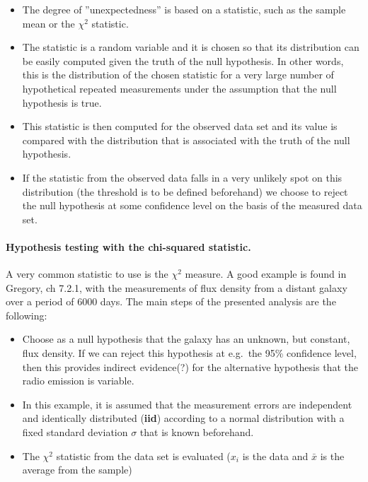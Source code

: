 \documentclass[%
oneside,                 %
final,                   %
10pt]{article}
\begin{document}
\noindent
\begin{itemize}
\item The degree of ''unexpectedness'' is based on a statistic, such as the sample mean or the $\chi^2$ statistic. 

\item The statistic is a random variable and it is chosen so that its distribution can be easily computed given the truth of the null hypothesis. In other words, this is the distribution of the chosen statistic for a very large number of hypothetical repeated measurements under the assumption that the null hypothesis is true. 

\item This statistic is then computed for the observed data set and its value is compared with the distribution that is associated with the truth of the null hypothesis.

\item If the statistic from the observed data falls in a very unlikely spot on this distribution (the threshold is to be defined beforehand) we choose to reject the null hypothesis at some confidence level on the basis of the measured data set. 
\end{itemize}

\noindent

\paragraph{Hypothesis testing with the chi-squared statistic.}
A very common statistic to use is the $\chi^2$ measure. A good example is found in Gregory, ch 7.2.1, with the measurements of flux density from a distant galaxy over a period of 6000 days. The main steps of the presented analysis are the following:

\begin{itemize}
\item Choose as a null hypothesis that the galaxy has an unknown, but constant, flux density. If we can reject this hypothesis at e.g.~the 95\% confidence level, then this provides indirect evidence(?) for the alternative hypothesis that the radio emission is variable.

\item In this example, it is assumed that the measurement errors are independent and identically distributed (\textbf{iid}) according to a normal distribution with a fixed standard deviation $\sigma$ that is known beforehand.

\item The $\chi^2$ statistic from the data set is evaluated ($x_i$ is the data and $\bar{x}$ is the average from the sample)
\end{itemize}
\end{document}

